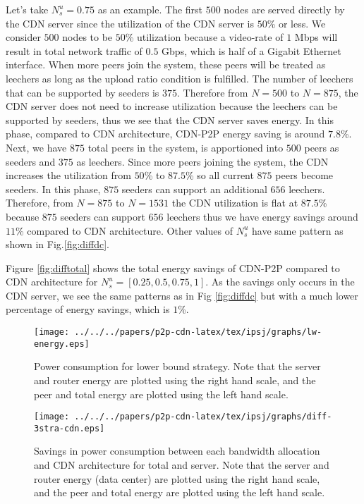 Let’s take $N_s^u=0.75$ as an example. 
The first $500$ nodes are served directly by the CDN server since the utilization of the CDN server is $50$\% or less. 
We consider $500$ nodes to be $50$\% utilization because a video-rate of $1$ Mbps will result in total network traffic of $0.5$ Gbps, which is half of a Gigabit Ethernet interface. 
When more peers join the system, these peers will be treated as leechers as long as the upload ratio condition is fulfilled. 
The number of leechers that can be supported by seeders is $375$. Therefore from $N=500$ to $N=875$, the CDN server does not need to increase utilization because the leechers can be supported by seeders, thus we see that the CDN server saves energy. 
In this phase, compared to CDN architecture, CDN-P2P energy saving is around $7.8$\%. Next, we have $875$ total peers in the system, is apportioned into $500$ peers as seeders and $375$ as leechers.  
Since more peers joining the system, the CDN increases the utilization from $50$\% to $87.5$\% so all current $875$ peers become seeders. 
In this phase, $875$ seeders can support an additional $656$ leechers. 
Therefore, from $N=875$ to $N=1531$ the CDN utilization is flat at $87.5$\% because $875$ seeders can support $656$ leechers thus we have energy savings around $11$\% compared to CDN architecture. 
Other values of $N_s^u$ have same pattern as shown in Fig.\ref{fig:diffdc}.

Figure \ref{fig:difftotal} shows the total energy savings of CDN-P2P compared to CDN architecture for $N_s^u=[0.25,0.5,0.75,1]$.  
As the savings only occurs in the CDN server, we see the same patterns as in Fig \ref{fig:diffdc} but with a much lower percentage of energy savings, which is $1$\%.

\begin{figure}[tb]
\begin{center}
\texttt{[image: ../../../papers/p2p-cdn-latex/tex/ipsj/graphs/lw-energy.eps]}
\end{center}
\caption{Power consumption for lower bound strategy. Note that the server and router energy are plotted using the right hand scale, and the peer and total energy are plotted using the left hand scale.}
\label{fig:lwenergy}
\vspace{-2mm}
\end{figure} 

\begin{figure}[tb]
\begin{center}
\texttt{[image: ../../../papers/p2p-cdn-latex/tex/ipsj/graphs/diff-3stra-cdn.eps]}
\end{center}
\caption{Savings in power consumption between each bandwidth allocation and CDN architecture for total and server.
Note that the server and router energy (data center) are plotted using the right hand scale, and the peer and total energy are plotted using the left hand scale.}
\label{fig:diff3stra}
\vspace{-2mm}
\end{figure} 

